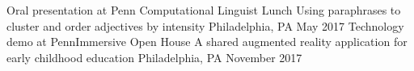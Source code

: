 \begin{cventries}
  \cventry
    {Oral presentation at Penn Computational Linguist Lunch}
    {Using paraphrases to cluster and order adjectives by intensity}
    {Philadelphia, PA}
    {May 2017}
    {}
  \cventry
    {Technology demo at PennImmersive Open House}
    {A shared augmented reality application for early childhood education}
    {Philadelphia, PA}
    {November 2017}
    {}
\end{cventries}

